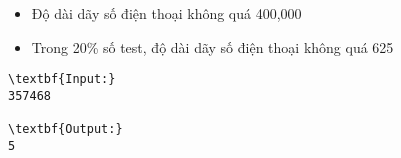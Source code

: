 \begin{itemize}
	\item Độ dài dãy số điện thoại không quá 400,000
	\item Trong 20\% số test, độ dài dãy số điện thoại không quá 625
\end{itemize}
\begin{verbatim}
\textbf{Input:}
357468

\textbf{Output:}
5\end{verbatim}